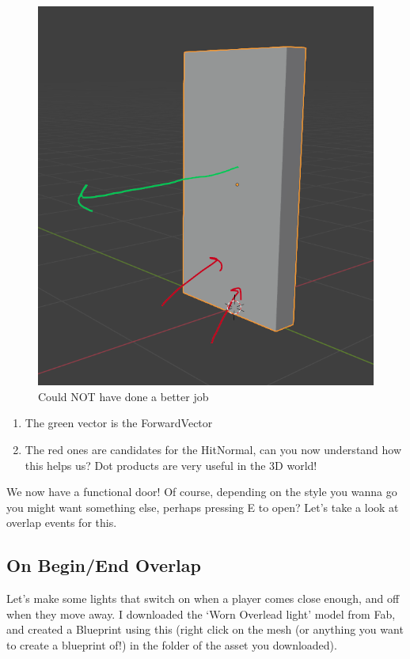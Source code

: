\documentclass[]{article}
\begin{document}
	\begin{figure}[h]
		\centering
		\includegraphics[width=1\linewidth]{week2part2/screenshot012}
		\caption{Could NOT have done a better job}
		\label{fig:screenshot012}
	\end{figure}
	
	\begin{enumerate}
		\item The green vector is the ForwardVector
		\item The red ones are candidates for the HitNormal, can you now understand how this helps us? Dot products are very useful in the 3D world!
	\end{enumerate}
	
	We now have a functional door! Of course, depending on the style you wanna go you might want something else, perhaps pressing E to open? Let's take a look at overlap events for this.
	
	\subsection{On Begin/End Overlap}
	
	Let's make some lights that switch on when a player comes close enough, and off when they move away. I downloaded the `Worn Overlead light' model from Fab, and created a Blueprint using this (right click on the mesh (or anything you want to create a blueprint of!) in the folder of the asset you downloaded).
	
\end{document}
